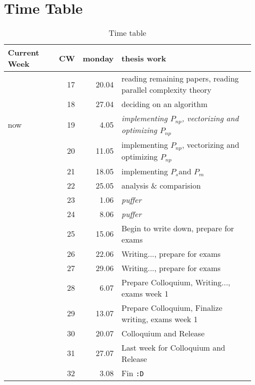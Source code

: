 \documentclass{article}
\newcommand{\seq}[0]{$P_{s}$}
\renewcommand{\mp}[0]{$P_{m}$}
\newcommand{\ndp}[0]{$P_{np}$}
\begin{document}
    \section{Time Table}
    \begin{table}[h]
        \begin{center}
        \caption{Time table} %
        \label{timetable}
        \begin{tabular}{lrrl}
            \toprule
            Current Week & CW & monday & thesis work \\
            \midrule
                & 17 & 20.04 & reading remaining papers, reading parallel complexity theory \\
                & 18 & 27.04 & deciding on an algorithm  \\
            now & 19 & 4.05  & \textit{implementing \ndp, vectorizing and optimizing \ndp} \\
                & 20 & 11.05 & implementing \ndp, vectorizing and optimizing \ndp\\
                & 21 & 18.05 & implementing \seq and \mp \\
                & 22 & 25.05 & analysis \& comparision \\
                & 23 & 1.06  & \textit{puffer} \\
                & 24 & 8.06  & \textit{puffer} \\
                & 25 & 15.06 & Begin to write down, prepare for exams\\
                & 26 & 22.06 & Writing..., prepare for exams \\
                & 27 & 29.06 & Writing..., prepare for exams \\
                & 28 & 6.07  & Prepare Colloquium, Writing..., exams week 1 \\
                & 29 & 13.07 & Prepare Colloquium, Finalize writing, exams week 1 \\
                & 30 & 20.07 & Colloquium and Release \\
                & 31 & 27.07 & Last week for Colloquium and Release \\
                & 32 & 3.08  & Fin \texttt{:D} \\
        \end{tabular}
        \end{center}
    \end{table}
    
\end{document}
